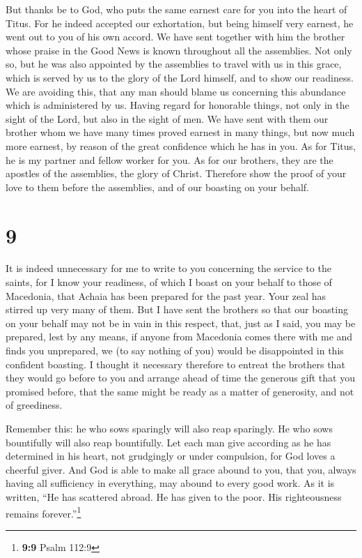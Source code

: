  But thanks be to God, who puts the same earnest care for
you into the heart of Titus.  For he indeed accepted our
exhortation, but being himself very earnest, he went out to you of his
own accord.  We have sent together with him the brother
whose praise in the Good News is known throughout all the assemblies.
 Not only so, but he was also appointed by the assemblies
to travel with us in this grace, which is served by us to the glory of
the Lord himself, and to show our readiness.  We are
avoiding this, that any man should blame us concerning this abundance
which is administered by us.  Having regard for honorable
things, not only in the sight of the Lord, but also in the sight of men.
 We have sent with them our brother whom we have many
times proved earnest in many things, but now much more earnest, by
reason of the great confidence which he has in you.  As
for Titus, he is my partner and fellow worker for you. As for our
brothers, they are the apostles of the assemblies, the glory of Christ.
 Therefore show the proof of your love to them before the
assemblies, and of our boasting on your behalf.

\hypertarget{section-8}{%
\section{9}\label{section-8}}

 It is indeed unnecessary for me to write to you
concerning the service to the saints,  for I know your
readiness, of which I boast on your behalf to those of Macedonia, that
Achaia has been prepared for the past year. Your zeal has stirred up
very many of them.  But I have sent the brothers so that
our boasting on your behalf may not be in vain in this respect, that,
just as I said, you may be prepared,  lest by any means,
if anyone from Macedonia comes there with me and finds you unprepared,
we (to say nothing of you) would be disappointed in this confident
boasting.  I thought it necessary therefore to entreat the
brothers that they would go before to you and arrange ahead of time the
generous gift that you promised before, that the same might be ready as
a matter of generosity, and not of greediness.

 Remember this: he who sows sparingly will also reap
sparingly. He who sows bountifully will also reap bountifully.
 Let each man give according as he has determined in his
heart, not grudgingly or under compulsion, for God loves a cheerful
giver.  And God is able to make all grace abound to you,
that you, always having all sufficiency in everything, may abound to
every good work.  As it is written, ``He has scattered
abroad. He has given to the poor. His righteousness remains
forever.''\footnote{\textbf{9:9} Psalm 112:9}

